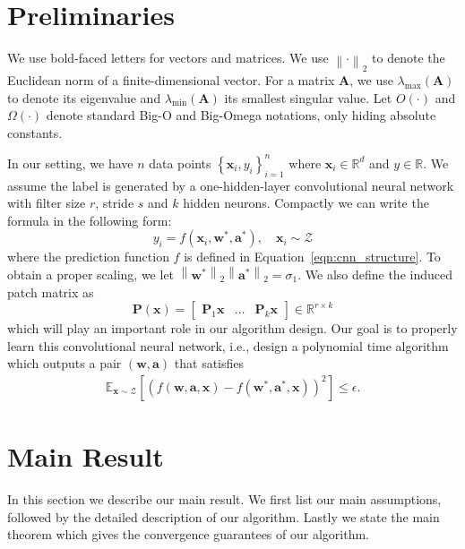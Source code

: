 \documentclass[11pt]{article}
\newcommand{\mat}[1]{\mathbf{#1}}
\newcommand{\vect}[1]{\mathbf{#1}}
\newcommand{\norm}[1]{\left\|#1\right\|}
\newcommand{\expect}{\mathbb{E}}
\newcommand{\inputdist}{\mathcal{Z}}
\begin{document}
\section{Preliminaries}
\label{sec:pre}
We use bold-faced letters for vectors and matrices.
We use $\norm{\cdot}_2$ to denote the Euclidean norm of a finite-dimensional vector.
For a matrix $\mat{A}$, we use $\lambda_{\max}\left(\mat{A}\right)$ to denote its eigenvalue and $\lambda_{\min}\left(\mat{A}\right)$ its smallest singular value.
Let $O(\cdot)$ and $\Omega\left(\cdot\right)$ denote standard Big-O and Big-Omega  notations, only hiding absolute constants.

In our setting, we have $n$ data points $\left\{\vect{x}_i,y_i\right\}_{i=1}^n$ where $\vect{x}_i \in \mathbb{R}^d$ and $y \in \mathbb{R}$.
We assume the label is generated by a one-hidden-layer convolutional neural network with filter size $r$, stride $s$ and $k$ hidden neurons.
Compactly we can write the formula in the following form:
 \[
y_i = f(\vect{x}_i,\vect{w}^*,\vect{a}^*),\quad \vect{x}_i \sim \inputdist
\] where  the prediction function $f$  is defined in Equation~\eqref{eqn:cnn_structure}.
To obtain a proper scaling, we let $\norm{\vect{w}^*}_2\norm{\vect{a}^*}_2 = \sigma_1$.
We also define the induced patch matrix as \[
\mat{P}\left(\vect{x}\right) = \begin{bmatrix}
\mat{P}_1\vect{x} & \ldots & \mat{P}_k \vect{x}
\end{bmatrix} \in \mathbb{R}^{r \times k}
\]
which will play an important role in our algorithm design.
Our goal is to properly learn this convolutional neural network, i.e., design a polynomial time algorithm which outputs a pair $(\vect{w},\vect{a})$ that satisfies \begin{align*}
	\expect_{\vect{x} \sim \inputdist}\left[ \left(f(\vect{w},\vect{a},\vect{x})-f(\vect{w}^*,\vect{a}^*,\vect{x})\right)^2\right] \le \epsilon.
\end{align*}

\section{Main Result}
\label{sec:main}
In this section we describe our main result. We first list our main assumptions, followed by the detailed description of our algorithm. Lastly we state the main theorem  which gives the convergence guarantees of our algorithm.
\end{document}
